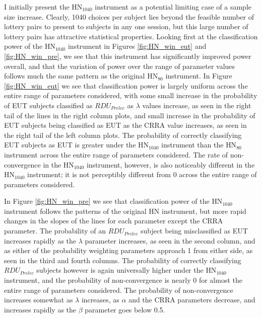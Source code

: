 \documentclass[../main.tex]{subfiles}
\begin{document}
I initially present the $\text{HN}_{1040}$ instrument as a potential limiting case of a sample size increase.
Clearly, 1040 choices per subject lies beyond the feasible number of lottery pairs to present to subjects in any one session, but this large number of lottery pairs has attractive statistical properties.
Looking first at the classification power of the $\text{HN}_{1040}$ instrument in Figures \ref{fig:HN_win_eut} and \ref{fig:HN_win_pre}, we see that this instrument has significantly improved power overall, and that the variation of power over the range of parameter values follows much the same pattern as the original $\text{HN}_{80}$ instrument.
In Figure \ref{fig:HN_win_eut} we see that classification power is largely uniform across the entire range of parameters considered, with some small increase in the probability of EUT subjects classified as $\mathit{RDU_{Prelec}}$ as $\lambda$ values increase, as seen in the right tail of the lines in the right column plots, and small increase in the probability of EUT subjects being classified as EUT as the CRRA value increases, as seen in the right tail of the left column plots.
The probability of correctly classifying EUT subjects as EUT is greater under the $\text{HN}_{1040}$ instrument than the $\text{HN}_{80}$ instrument across the entire range of parameters considered.
The rate of non-convergence in the $\text{HN}_{1040}$ instrument, however, is also noticeably different in the $\text{HN}_{1040}$ instrument; it is not perceptibly different from 0 across the entire range of parameters considered.

In Figure \ref{fig:HN_win_pre} we see that classification power of the $\text{HN}_{1040}$ instrument follows the patterns of the original HN instrument, but more rapid changes in the slopes of the lines for each parameter except the CRRA parameter.
The probability of an $\mathit{RDU_{Prelec}}$ subject being misclassified as EUT increases rapidly as the $\lambda$ parameter increases, as seen in the second column, and as either of the probability weighting parameters approach 1 from either side, as seen in the third and fourth columns.
The probability of correctly classifying $\mathit{RDU_{Prelec}}$ subjects however is again universally higher under the $\text{HN}_{1040}$ instrument, and the probability of non-convergence is nearly 0 for almost the entire range of parameters considered.
The probability of non-convergence increases somewhat as $\lambda$ increases, as $\alpha$ and the CRRA parameters decrease, and increases rapidly as the $\beta$ parameter goes below 0.5.
\end{document}
